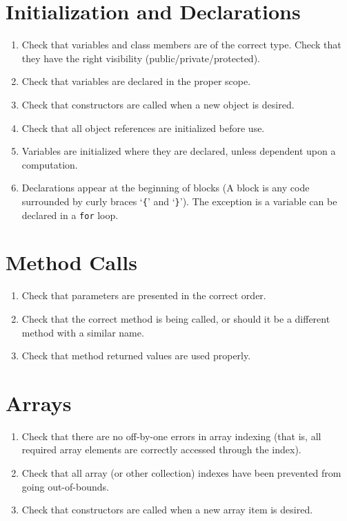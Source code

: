 \section*{Initialization and Declarations}\begin{enumerate}[resume]
\item Check that variables and class members are of the correct type. Check that they have the right visibility (public/private/protected).
\item Check that variables are declared in the proper scope.
\item Check that constructors are called when a new object is desired.
\item Check that all object references are initialized before use.
\item Variables are initialized where they are declared, unless dependent upon a computation.
\item Declarations appear at the beginning of blocks (A block is any code surrounded by curly braces `\texttt{\{}' and `\texttt{\}}'). The exception is a variable can be declared in a \texttt{for} loop.
\end{enumerate}

\section*{Method Calls}\begin{enumerate}[resume]
\item Check that parameters are presented in the correct order.
\item Check that the correct method is being called, or should it be a different method with a similar name.
\item Check that method returned values are used properly.
\end{enumerate}

\section*{Arrays}\begin{enumerate}[resume]
\item Check that there are no off-by-one errors in array indexing (that is, all required array elements are correctly accessed through the index).
\item Check that all array (or other collection) indexes have been prevented from going out-of-bounds.
\item Check that constructors are called when a new array item is desired.
\end{enumerate}

